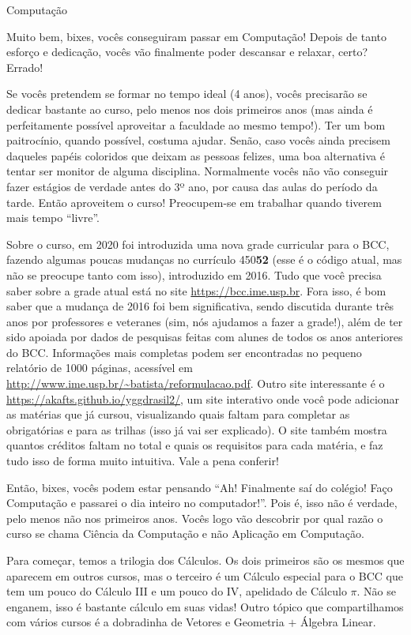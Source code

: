 \begin{subsecao}{Computação}

Muito bem, bixes, vocês conseguiram passar em Computação! Depois de tanto
esforço e dedicação, vocês vão finalmente poder descansar e relaxar, certo?
Errado!

Se vocês pretendem se formar no tempo ideal (4 anos), vocês precisarão se
dedicar bastante ao curso, pelo menos nos dois primeiros anos (mas ainda é
perfeitamente possível aproveitar a faculdade ao mesmo tempo!). Ter um bom
paitrocínio, quando possível, costuma ajudar. Senão, caso vocês ainda precisem
daqueles papéis coloridos que deixam as pessoas felizes, uma boa alternativa é
tentar ser monitor de alguma disciplina. Normalmente vocês não vão conseguir 
fazer estágios de verdade antes do 3º ano, por causa das aulas do período da tarde. 
Então aproveitem o curso! Preocupem-se em trabalhar quando tiverem mais tempo ``livre''.

Sobre o curso, em 2020 foi introduzida uma nova grade curricular para o BCC,
fazendo algumas poucas mudanças no currículo 450\textbf{52} (esse é o código
atual, mas não se preocupe tanto com isso), introduzido em 2016. Tudo que você
precisa saber sobre a grade atual está no site
\url{https://bcc.ime.usp.br}.
Fora isso, é bom saber que a mudança de 2016 foi bem significativa, sendo
discutida durante três anos por professores e veteranes (sim, nós ajudamos a
fazer a grade!), além de ter sido apoiada por dados de pesquisas feitas com
alunes de todos os anos anteriores do BCC. Informações mais completas podem
ser encontradas no pequeno relatório de 1000 páginas, acessível em
\url{http://www.ime.usp.br/~batista/reformulacao.pdf}. Outro site interessante é o 
\url{https://akafts.github.io/yggdrasil2/}, um
site interativo onde você pode adicionar as matérias que já cursou,
visualizando quais faltam para completar as obrigatórias e para as trilhas
(isso já vai ser explicado). O site também mostra quantos créditos faltam no
total e quais os requisitos para cada matéria, e faz tudo isso de forma muito
intuitiva. Vale a pena conferir!

Então, bixes, vocês podem estar pensando ``Ah! Finalmente saí do colégio! Faço
Computação e passarei o dia inteiro no computador!''. Pois é, isso não é
verdade, pelo menos não nos primeiros anos. Vocês logo vão descobrir por qual
razão o curso se chama Ciência da Computação e não Aplicação em Computação.

Para começar, temos a trilogia dos Cálculos. Os dois primeiros são os mesmos
que aparecem em outros cursos, mas o terceiro é um Cálculo especial para o BCC
que tem um pouco do Cálculo III e um pouco do IV, apelidado de Cálculo $\pi$.
Não se enganem, isso é bastante cálculo em suas vidas! Outro tópico que
compartilhamos com vários cursos é a dobradinha de Vetores e Geometria $+$
Álgebra Linear. 


\end{subsecao}
